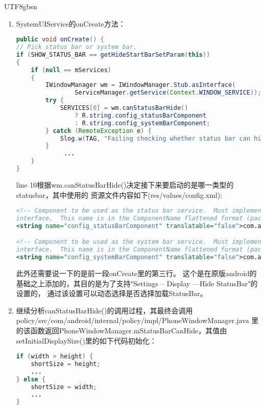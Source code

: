 \documentclass[a4paper,11pt]{article}
\begin{document}
\begin{CJK*}{UTF8}{gbsn}
\begin{enumerate}
\begin{lstlisting}[language=JAVA]
        startSystemUi(contextF);                                                                                                                                                      
        try {
        if (batteryF != null) batteryF.systemReady();
        } catch (Throwable e) {
        reportWtf("making Battery Service ready", e); 
        }
         ...
}
\end{lstlisting}
        其中startSystemUi()启动了com.android.systemui.SystemUIService这个服务。
        \item SystemUIService的onCreate方法：
\begin{lstlisting}[language=JAVA]
public void onCreate() {
// Pick status bar or system bar.                                                                                                                                                     
if (SHOW_STATUS_BAR == getHideStartBarSetParam(this))
{   
    if (null == mServices)
    {   
        IWindowManager wm = IWindowManager.Stub.asInterface(
                ServiceManager.getService(Context.WINDOW_SERVICE));
        try {
            SERVICES[0] = wm.canStatusBarHide()
                ? R.string.config_statusBarComponent
                : R.string.config_systemBarComponent;
        } catch (RemoteException e) {
            Slog.w(TAG, "Failing checking whether status bar can hide", e); 
        }   
             ...
    }
}
\end{lstlisting}
       line 10根据wm.canStatusBarHide()决定接下来要启动的是哪一类型的statusbar，其中使用的
       资源文件内容如下(res/values/config.xml):
\begin{lstlisting}[language=XML]
<!-- Component to be used as the status bar service.  Must implement the IStatusBar
interface.  This name is in the ComponentName flattened format (package/class)  -->
<string name="config_statusBarComponent" translatable="false">com.android.systemui.statusbar.phone.PhoneStatusBar</string>                                                                

<!-- Component to be used as the system bar service.  Must implement the IStatusBar
interface.  This name is in the ComponentName flattened format (package/class)  -->
<string name="config_systemBarComponent" translatable="false">com.android.systemui.statusbar.tablet.TabletStatusBar</string>

\end{lstlisting}
        此外还需要说一下的是前一段onCreate里的第三行。
        这个是在原版android的基础之上添加的，其目的是为了支持"Settings -- Display ---Hide StatusBar"的设置的，
        通过该设置可以动态选择是否选择加载StatusBar。
        \item 继续分析canStatusBarHide()的调用过程，其最终会调用\\
        policy/src/com/android/internal/policy/impl/PhoneWindowManager.java
        里的该函数返回PhoneWindowManager.mStatusBarCanHide，其值由setInitialDisplaySize()里的如下代码初始化：
\begin{lstlisting}[language=JAVA]
if (width > height) {
    shortSize = height;
    ...
} else {
    shortSize = width;
    ...
}    


\end{lstlisting}
\end{enumerate}
\end{CJK*}
\end{document}
